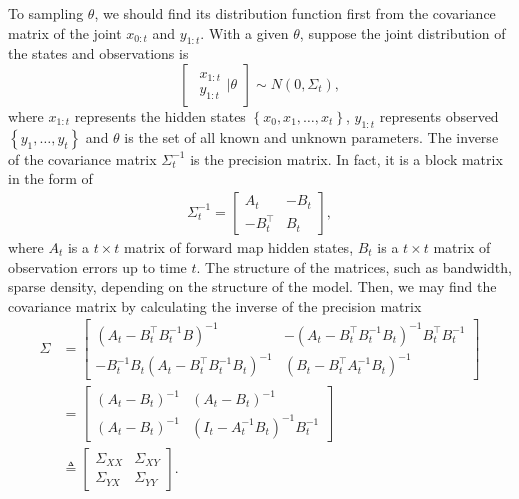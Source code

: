 To sampling $\theta$, we should find its distribution function first from the covariance matrix of the joint $x_{0:t}$ and $y_{1:t}$. With a given $\theta$, suppose the joint distribution of the states and observations is  
\begin{equation}\label{generaljointmatrix}
\begin{bmatrix} \begin{matrix} x_{1:t}\\ y_{1:t}  \end{matrix} \biggr\rvert \theta \end{bmatrix}
\sim N\left(0, \Sigma_t \right),
\end{equation}
where $x_{1:t}$ represents the hidden states $\left\lbrace x_0,x_1,\dots,x_t\right\rbrace$, $y_{1:t}$ represents observed $\left\lbrace y_1,\dots,y_t\right\rbrace$ and $\theta$ is the set of all known and unknown parameters. The inverse of the covariance matrix $\Sigma_t^{-1}$ is the precision matrix. In fact, it is a block matrix in the form of 
\begin{align*} \Sigma_t^{-1}=
\begin{bmatrix}
A_t& -B_t \\ -B_t^\top & B_t
\end{bmatrix}, 
\end{align*}
where $A_t$ is a $t \times t$ matrix of forward map hidden states, $B_t$ is a $t\times t$ matrix of observation errors up to time $t$. The structure of the matrices, such as bandwidth, sparse density, depending on the structure of the model. %
Then, we may find the covariance matrix by calculating the inverse of the precision matrix 
\begin{align*}
\Sigma &= \begin{bmatrix}
\left(A_t-B_t^\top B_t^{-1}B\right) ^{-1} & -\left(A_t-B_t^\top B_t^{-1}B_t\right)^{-1}B_t^\top B_t^{-1}\\
- B_t^{-1}B_t\left(A_t-B_t^\top B_t^{-1}B_t\right)^{-1} & \left(B_t-B_t^\top A_t^{-1}B_t\right) ^{-1}
\end{bmatrix} \\
&= \begin{bmatrix}
\left(A_t-B_t\right) ^{-1} & \left(A_t-B_t\right)^{-1}\\
\left(A_t-B_t\right)^{-1} & \left(I_t- A_t^{-1}B_t\right) ^{-1}B_t^{-1}
\end{bmatrix} \\
&\triangleq \begin{bmatrix}
\Sigma_{XX} & \Sigma_{XY} \\
\Sigma_{YX}  &\Sigma_{YY} 
\end{bmatrix}.
\end{align*}
